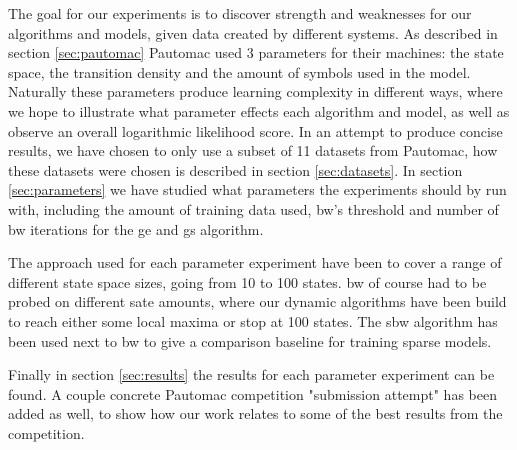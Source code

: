 The goal for our experiments is to discover strength and weaknesses for our algorithms and models, given data created by different systems. As described in section \ref{sec:pautomac} Pautomac used 3 parameters for their machines: the state space, the transition density and the amount of symbols used in the model. Naturally these parameters produce learning complexity in different ways, where we hope to illustrate what parameter effects each algorithm and model, as well as observe an overall logarithmic likelihood score. In an attempt to produce concise results, we have chosen to only use a subset of 11 datasets from Pautomac, how these datasets were chosen is described in section \ref{sec:datasets}. In section \ref{sec:parameters} we have studied what parameters the experiments should by run with, including the amount of training data used, \gls{bw}'s threshold and number of \gls{bw} iterations for the \gls{ge} and \gls{gs} algorithm. 

The approach used for each parameter experiment have been to cover a range of different state space sizes, going from 10 to 100 states. \gls{bw} of course had to be probed on different sate amounts, where our dynamic algorithms have been build to reach either some local maxima or stop at 100 states. The \gls{sbw} algorithm has been used next to \gls{bw} to give a comparison baseline for training sparse models.

Finally in section \ref{sec:results} the results for each parameter experiment can be found. A couple concrete Pautomac competition "submission attempt" has been added as well, to show how our work relates to some of the best results from the competition.